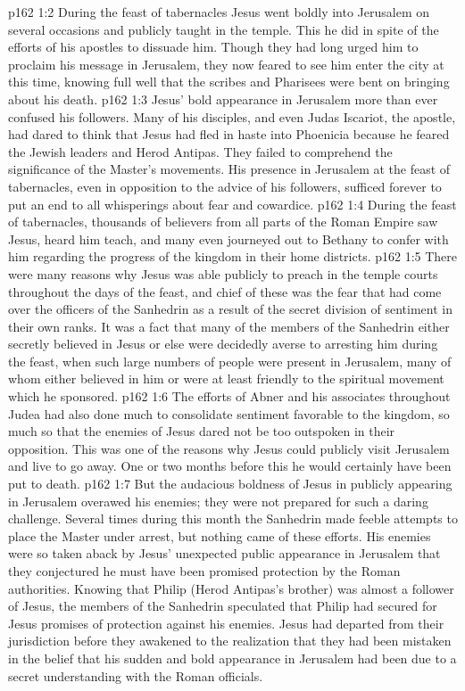 \vs p162 1:2 During the feast of tabernacles Jesus went boldly into Jerusalem on several occasions and publicly taught in the temple. This he did in spite of the efforts of his apostles to dissuade him. Though they had long urged him to proclaim his message in Jerusalem, they now feared to see him enter the city at this time, knowing full well that the scribes and Pharisees were bent on bringing about his death.
\vs p162 1:3 Jesus’ bold appearance in Jerusalem more than ever confused his followers. Many of his disciples, and even Judas Iscariot, the apostle, had dared to think that Jesus had fled in haste into Phoenicia because he feared the Jewish leaders and Herod Antipas. They failed to comprehend the significance of the Master’s movements. His presence in Jerusalem at the feast of tabernacles, even in opposition to the advice of his followers, sufficed forever to put an end to all whisperings about fear and cowardice.
\vs p162 1:4 During the feast of tabernacles, thousands of believers from all parts of the Roman Empire saw Jesus, heard him teach, and many even journeyed out to Bethany to confer with him regarding the progress of the kingdom in their home districts.
\vs p162 1:5 There were many reasons why Jesus was able publicly to preach in the temple courts throughout the days of the feast, and chief of these was the fear that had come over the officers of the Sanhedrin as a result of the secret division of sentiment in their own ranks. It was a fact that many of the members of the Sanhedrin either secretly believed in Jesus or else were decidedly averse to arresting him during the feast, when such large numbers of people were present in Jerusalem, many of whom either believed in him or were at least friendly to the spiritual movement which he sponsored.
\vs p162 1:6 The efforts of Abner and his associates throughout Judea had also done much to consolidate sentiment favorable to the kingdom, so much so that the enemies of Jesus dared not be too outspoken in their opposition. This was one of the reasons why Jesus could publicly visit Jerusalem and live to go away. One or two months before this he would certainly have been put to death.
\vs p162 1:7 But the audacious boldness of Jesus in publicly appearing in Jerusalem overawed his enemies; they were not prepared for such a daring challenge. Several times during this month the Sanhedrin made feeble attempts to place the Master under arrest, but nothing came of these efforts. His enemies were so taken aback by Jesus’ unexpected public appearance in Jerusalem that they conjectured he must have been promised protection by the Roman authorities. Knowing that Philip (Herod Antipas’s brother) was almost a follower of Jesus, the members of the Sanhedrin speculated that Philip had secured for Jesus promises of protection against his enemies. Jesus had departed from their jurisdiction before they awakened to the realization that they had been mistaken in the belief that his sudden and bold appearance in Jerusalem had been due to a secret understanding with the Roman officials.
